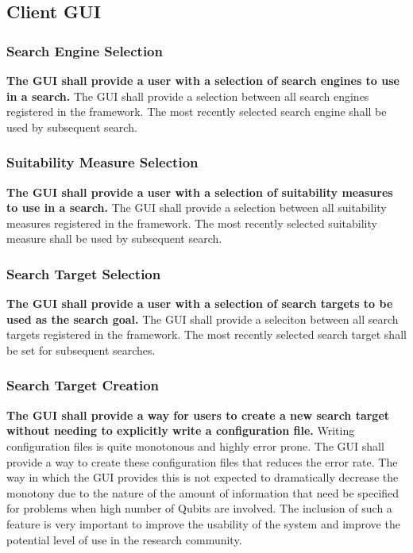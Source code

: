 \documentclass[authoryearcitations]{UoYCSproject}
\begin{document}
\subsection{Client GUI}
\subsubsection{Search Engine Selection}
\textbf{The GUI shall provide a user with a selection of search engines to use in a search.}
The GUI shall provide a selection between all search engines registered in the framework.
The most recently selected search engine shall be used by subsequent search.

\subsubsection{Suitability Measure Selection}
\textbf{The GUI shall provide a user with a selection of suitability measures to use in a search.}
The GUI shall provide a selection between all suitability measures registered in the framework.
The most recently selected suitability measure shall be used by subsequent search.

\subsubsection{Search Target Selection}
\textbf{The GUI shall provide a user with a selection of search targets to be used as the search goal.}
The GUI shall provide a seleciton between all search targets registered in the framework.
The most recently selected search target shall be set for subsequent searches.

\subsubsection{Search Target Creation}
\textbf{The GUI shall provide a way for users to create a new search target without needing to explicitly write a configuration file.}
Writing configuration files is quite monotonous and highly error prone.
The GUI shall provide a way to create these configuration files that reduces the error rate.
The way in which the GUI provides this is not expected to dramatically decrease the monotony due to the nature of the amount of information that need be specified for problems when high number of Qubits are involved.
The inclusion of such a feature is very important to improve the usability of the system and improve the potential level of use in the research community.
\end{document}
